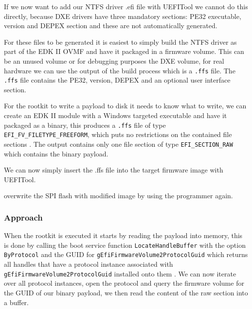 If we now want to add our NTFS driver .efi file with UEFITool we cannot do this directly, because DXE drivers have three mandatory sections: PE32 executable, version and DEPEX section \cite[Vol 3, 2.1.4.1.4]{pi-spec} and these are not automatically generated.

For these files to be generated it is easiest to simply build the \ac{NTFS} driver as part of the \ac{EDK} II \ac{OVMF} and have it packaged in a firmware volume. This can be an unused volume or for debugging purposes the \ac{DXE} volume, for real hardware we can use the output of the build process which is a \lstinline{.ffs} file. The \lstinline{.ffs} file contains the \ac{PE32}, version, \ac{DEPEX} and an optional user interface section.

For the rootkit to write a payload to disk it needs to know what to write, we can create an \ac{EDK} II module with a Windows targeted executable and have it packaged as a binary, this produces a \lstinline{.ffs} file of type \lstinline{EFI_FV_FILETYPE_FREEFORM}, which puts no restrictions on the contained file sections \cite[Vol 3, 2.1.4.1.7]{pi-spec}. The output contains only one file section of type \lstinline{EFI_SECTION_RAW} which contains the binary payload.

We can now simply insert the .ffs file into the target firmware image with UEFITool.

overwrite the SPI flash with modified image by using the programmer again.

\subsubsection{Approach}

When the rootkit is executed it starts by reading the payload into memory, this is done by calling the boot service function \lstinline{LocateHandleBuffer} with the option \lstinline{ByProtocol} and the \ac{GUID} for \lstinline{gEfiFirmwareVolume2ProtocolGuid} which returns all handles that have a protocol instance associated with \lstinline{gEfiFirmwareVolume2ProtocolGuid} installed onto them \cite[7.3]{uefi-spec}. We can now iterate over all protocol instances, open the protocol and query the firmware volume for the \ac{GUID} of our binary payload, we then read the content of the raw section into a buffer. 

